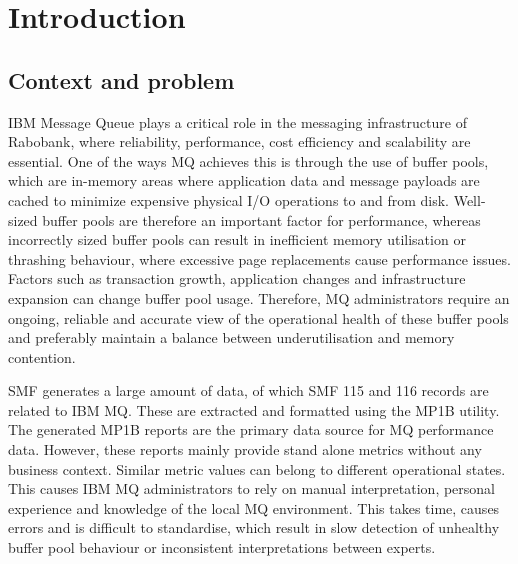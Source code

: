 


% 

\section{Introduction}%
\label{sec:inleiding}

\subsection{Context and problem}%
IBM Message Queue plays a critical role in the messaging infrastructure of Rabobank, where reliability, performance, cost efficiency and scalability are essential. One of the ways MQ achieves this is through the use of buffer pools, which are in-memory areas where application data and message payloads are cached to minimize expensive physical I/O operations to and from disk. Well-sized buffer pools are therefore an important factor for performance, whereas incorrectly sized buffer pools can result in inefficient memory utilisation or thrashing behaviour, where excessive page replacements cause performance issues. Factors such as transaction growth, application changes and infrastructure expansion can change buffer pool usage. Therefore, MQ administrators require an ongoing, reliable and accurate view of the operational health of these buffer pools and preferably maintain a balance between underutilisation and memory contention.

SMF generates a large amount of data, of which SMF 115 and 116 records are related to IBM MQ. These are extracted and formatted using the MP1B utility. The generated MP1B reports are the primary data source for MQ performance data. However, these reports mainly provide stand alone metrics without any business context. Similar metric values can belong to different operational states. This causes IBM MQ administrators to rely on manual interpretation, personal experience and knowledge of the local MQ environment. This takes time, causes errors and is difficult to standardise, which result in slow detection of unhealthy buffer pool behaviour or inconsistent interpretations between experts.


